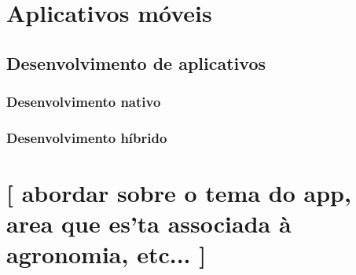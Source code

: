 \section{Aplicativos móveis}\label{sec:apps}
\lipsum[1]


\subsection{Desenvolvimento de aplicativos}\label{ssec:dev_apps}
\lipsum[1]

\subsubsection{Desenvolvimento nativo}\label{sssec:dev_apps_nativo}
\lipsum[1]

\subsubsection{Desenvolvimento híbrido}\label{sssec:dev_apps_hibrido}
\lipsum[1]


\section{[ abordar sobre o tema do app, area que es'ta associada à agronomia, etc... ]}
\lipsum[1]

